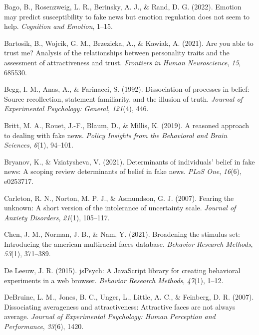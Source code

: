 \documentclass[
  man,floatsintext]{apa6}
\newlength{\cslhangindent}
\newlength{\cslentryspacingunit} %
\newenvironment{CSLReferences}[2] %
 {%
  \setlength{\parindent}{0pt}
  \ifodd #1
  \let\oldpar\par
  \def\par{\hangindent=\cslhangindent\oldpar}
  \fi
  \setlength{\parskip}{#2\cslentryspacingunit}
 }%
 {}
\begin{document}
\hypertarget{refs}{}
\begin{CSLReferences}{1}{0}
\leavevmode{}%
Bago, B., Rosenzweig, L. R., Berinsky, A. J., \& Rand, D. G. (2022). Emotion may predict susceptibility to fake news but emotion regulation does not seem to help. \emph{Cognition and Emotion}, 1--15.

\leavevmode{}%
Bartosik, B., Wojcik, G. M., Brzezicka, A., \& Kawiak, A. (2021). Are you able to trust me? Analysis of the relationships between personality traits and the assessment of attractiveness and trust. \emph{Frontiers in Human Neuroscience}, \emph{15}, 685530.

\leavevmode{}%
Begg, I. M., Anas, A., \& Farinacci, S. (1992). Dissociation of processes in belief: Source recollection, statement familiarity, and the illusion of truth. \emph{Journal of Experimental Psychology: General}, \emph{121}(4), 446.

\leavevmode{}%
Britt, M. A., Rouet, J.-F., Blaum, D., \& Millis, K. (2019). A reasoned approach to dealing with fake news. \emph{Policy Insights from the Behavioral and Brain Sciences}, \emph{6}(1), 94--101.

\leavevmode{}%
Bryanov, K., \& Vziatysheva, V. (2021). Determinants of individuals' belief in fake news: A scoping review determinants of belief in fake news. \emph{PLoS One}, \emph{16}(6), e0253717.

\leavevmode{}%
Carleton, R. N., Norton, M. P. J., \& Asmundson, G. J. (2007). Fearing the unknown: A short version of the intolerance of uncertainty scale. \emph{Journal of Anxiety Disorders}, \emph{21}(1), 105--117.

\leavevmode{}%
Chen, J. M., Norman, J. B., \& Nam, Y. (2021). Broadening the stimulus set: Introducing the american multiracial faces database. \emph{Behavior Research Methods}, \emph{53}(1), 371--389.

\leavevmode{}%
De Leeuw, J. R. (2015). jsPsych: A JavaScript library for creating behavioral experiments in a web browser. \emph{Behavior Research Methods}, \emph{47}(1), 1--12.

\leavevmode{}%
DeBruine, L. M., Jones, B. C., Unger, L., Little, A. C., \& Feinberg, D. R. (2007). Dissociating averageness and attractiveness: Attractive faces are not always average. \emph{Journal of Experimental Psychology: Human Perception and Performance}, \emph{33}(6), 1420.


\end{CSLReferences}
\end{document}
